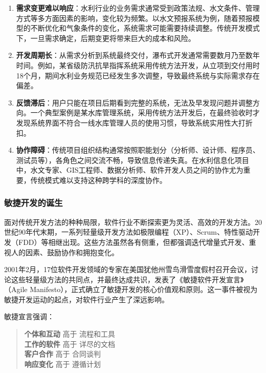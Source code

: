 \begin{enumerate}
\def\labelenumi{\arabic{enumi}.}
\item
  \textbf{需求变更难以响应}：水利行业的业务需求通常受到政策法规、水文条件、管理方式等多方面因素的影响，变化较为频繁。以水文预报系统为例，随着预报模型的不断优化和气象条件的变化，系统需求可能需要持续调整。传统开发模式下，一旦需求确定，后期变更将带来巨大的成本和风险。
\item
  \textbf{开发周期长}：从需求分析到系统最终交付，瀑布式开发通常需要数月乃至数年时间。例如，某省级防汛抗旱指挥系统采用传统方法开发，从立项到交付用时18个月，期间水利业务规范已经发生多次调整，导致最终系统与实际需求存在偏差。
\item
  \textbf{反馈滞后}：用户只能在项目后期看到完整的系统，无法及早发现问题并调整方向。一个典型案例是某水库管理系统，采用传统方法开发后，在最终验收时才发现系统界面不符合一线水库管理人员的使用习惯，导致系统实用性大打折扣。
\item
  \textbf{协作障碍}：传统项目组织结构通常按照职能划分（分析师、设计师、程序员、测试员等），各角色之间交流不畅，导致信息传递失真。在水利信息化项目中，水文专家、GIS工程师、数据分析师、软件开发人员之间的协作尤为重要，传统模式难以支持这种跨学科的深度协作。
\end{enumerate}

\subsubsection{敏捷开发的诞生}\label{ux654fux6377ux5f00ux53d1ux7684ux8bdeux751f}

面对传统开发方法的种种局限，软件行业不断探索更为灵活、高效的开发方法。20世纪90年代末期，一系列轻量级开发方法如极限编程（XP）、Scrum、特性驱动开发（FDD）等相继出现。这些方法虽然各有侧重，但都强调迭代增量式开发、重视人的因素、鼓励协作和拥抱变化。

2001年2月，17位软件开发领域的专家在美国犹他州雪鸟滑雪度假村召开会议，讨论这些轻量级方法的共同点，并最终达成共识，发表了《敏捷软件开发宣言》（Agile
Manifesto），正式确立了敏捷开发的核心价值观和原则。这一事件被视为敏捷开发运动的起点，对软件行业产生了深远影响。

敏捷宣言强调：

\begin{quote}
\textbf{个体和互动} 高于 流程和工具\\
\textbf{工作的软件} 高于 详尽的文档\\
\textbf{客户合作} 高于 合同谈判\\
\textbf{响应变化} 高于 遵循计划
\end{quote}

